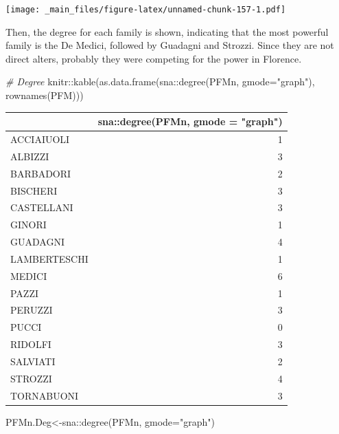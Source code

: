 \documentclass[
  notitlepage,
  onecolumn,
  openany]{book}
\newenvironment{Shaded}{\begin{snugshade}}{\end{snugshade}}
\newcommand{\AttributeTok}[1]{\textcolor[rgb]{0.77,0.63,0.00}{#1}}
\newcommand{\CommentTok}[1]{\textcolor[rgb]{0.56,0.35,0.01}{\textit{#1}}}
\newcommand{\FunctionTok}[1]{\textcolor[rgb]{0.00,0.00,0.00}{#1}}
\newcommand{\NormalTok}[1]{#1}
\newcommand{\OtherTok}[1]{\textcolor[rgb]{0.56,0.35,0.01}{#1}}
\newcommand{\SpecialCharTok}[1]{\textcolor[rgb]{0.00,0.00,0.00}{#1}}
\newcommand{\StringTok}[1]{\textcolor[rgb]{0.31,0.60,0.02}{#1}}
\begin{document}
\texttt{[image: \_main\_files/figure-latex/unnamed-chunk-157-1.pdf]}

Then, the degree for each family is shown, indicating that the most powerful family is the De Medici, followed by Guadagni and Strozzi. Since they are not direct alters, probably they were competing for the power in Florence.

\begin{Shaded}
\begin{Highlighting}[]
\CommentTok{\# Degree}
\NormalTok{knitr}\SpecialCharTok{::}\FunctionTok{kable}\NormalTok{(}\FunctionTok{as.data.frame}\NormalTok{(sna}\SpecialCharTok{::}\FunctionTok{degree}\NormalTok{(PFMn, }\AttributeTok{gmode=}\StringTok{"graph"}\NormalTok{), }\FunctionTok{rownames}\NormalTok{(PFM)))}
\end{Highlighting}
\end{Shaded}

\begin{tabular}{l|r}
\hline
  & sna::degree(PFMn, gmode = "graph")\\
\hline
ACCIAIUOLI & 1\\
\hline
ALBIZZI & 3\\
\hline
BARBADORI & 2\\
\hline
BISCHERI & 3\\
\hline
CASTELLANI & 3\\
\hline
GINORI & 1\\
\hline
GUADAGNI & 4\\
\hline
LAMBERTESCHI & 1\\
\hline
MEDICI & 6\\
\hline
PAZZI & 1\\
\hline
PERUZZI & 3\\
\hline
PUCCI & 0\\
\hline
RIDOLFI & 3\\
\hline
SALVIATI & 2\\
\hline
STROZZI & 4\\
\hline
TORNABUONI & 3\\
\hline
\end{tabular}

\begin{Shaded}
\begin{Highlighting}[]
\NormalTok{PFMn.Deg}\OtherTok{\textless{}{-}}\NormalTok{sna}\SpecialCharTok{::}\FunctionTok{degree}\NormalTok{(PFMn, }\AttributeTok{gmode=}\StringTok{"graph"}\NormalTok{)}
\end{Highlighting}
\end{Shaded}
\end{document}
